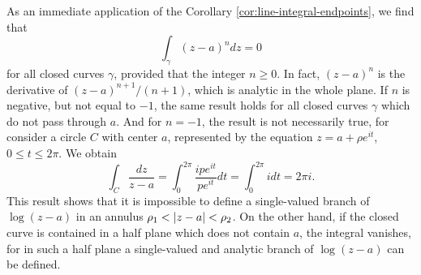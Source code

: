 \begin{example}
As an immediate application of the Corollary \ref{cor:line-integral-endpoints}, we find that $$\int_{\gamma}(z-a)^ndz=0$$ for all closed curves $\gamma$, provided that the integer $n \ge 0$. In fact, $(z-a)^n$ is the derivative of $(z-a)^{n+1}/(n+1)$, which is analytic in the whole plane. If $n$ is negative, but not equal to $-1$, the same result holds for all closed curves $\gamma$ which do not pass through $a$. And for $n=-1$, the result is not necessarily true, for consider a circle $C$ with center $a$, represented by the equation $z=a+\rho e^{it}$, $0 \le t \le 2\pi$. We obtain $$\int_{C}\dfrac{dz}{z-a}=\int_{0}^{2\pi}\dfrac{ipe^{it}}{pe^{it}}dt=\int_{0}^{2\pi}idt=2\pi i.$$ This result shows that it is impossible to define a single-valued branch of $\log(z-a)$ in an annulus $\rho_1<\lvert z-a \rvert<\rho_2$. On the other hand, if the closed curve is contained in a half plane which does not contain $a$, the integral vanishes, for in such a half plane a single-valued and analytic branch of $\log(z-a)$ can be defined.
\end{example}

